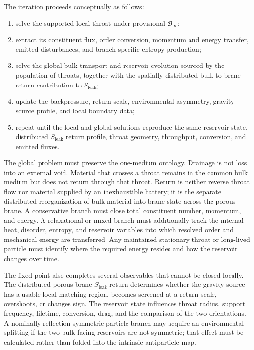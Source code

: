 The iteration proceeds conceptually as follows:

\begin{enumerate}[leftmargin=2.2em,itemsep=0.36em]
  \item solve the supported local throat under provisional \(\mathcal B_\infty\);
  \item extract its constituent flux, order conversion, momentum and energy
        transfer, emitted disturbances, and branch-specific entropy production;
  \item solve the global bulk transport and reservoir evolution sourced by the
        population of throats, together with the spatially distributed
        bulk-to-brane return contribution to \(S_{\mathrm{leak}}\);
  \item update the backpressure, return scale, environmental asymmetry, gravity
        source profile, and local boundary data;
  \item repeat until the local and global solutions reproduce the same reservoir
        state, distributed \(S_{\mathrm{leak}}\) return profile, throat geometry,
        throughput, conversion, and emitted fluxes.
\end{enumerate}

The global problem must preserve the one-medium ontology. Drainage is not loss
into an external void. Material that crosses a throat remains in the common bulk
medium but does not return through that throat. Return is neither reverse throat
flow nor material supplied by an inexhaustible battery; it is the separate
distributed reorganization of bulk material into brane state across the porous
brane. A conservative branch must close total constituent number, momentum, and
energy. A relaxational or mixed branch must additionally track the internal heat,
disorder, entropy, and reservoir variables into which resolved order and
mechanical energy are transferred. Any maintained stationary throat or long-lived
particle must identify where the required energy resides and how the reservoir
changes over time.

The fixed point also completes several observables that cannot be closed locally.
The distributed porous-brane \(S_{\mathrm{leak}}\) return determines whether the
gravity source has a usable local matching region, becomes screened at a return
scale, overshoots, or changes sign.
The reservoir state influences throat radius, support frequency, lifetime,
conversion, drag, and the comparison of the two orientations. A nominally
reflection-symmetric particle branch may acquire an environmental splitting if
the two bulk-facing reservoirs are not symmetric; that effect must be calculated
rather than folded into the intrinsic antiparticle map.

